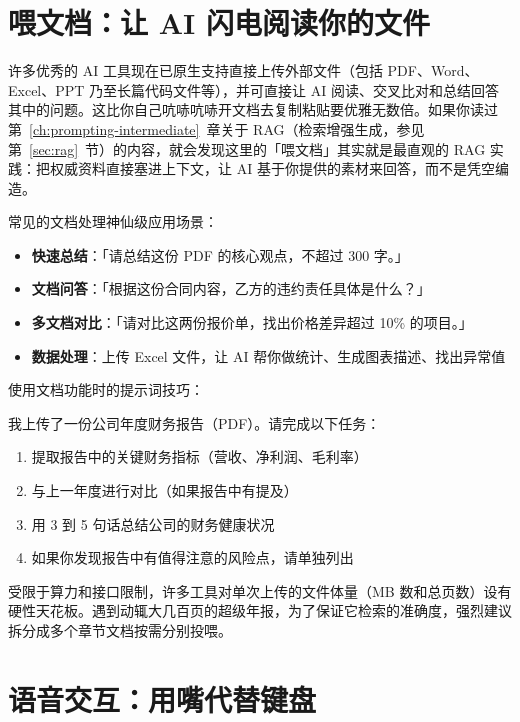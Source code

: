 \section{喂文档：让 AI 闪电阅读你的文件}

许多优秀的 AI 工具现在已原生支持直接上传外部文件（包括 PDF、Word、Excel、PPT 乃至长篇代码文件等），并可直接让 AI 阅读、交叉比对和总结回答其中的问题。这比你自己吭哧吭哧开文档去复制粘贴要优雅无数倍。如果你读过第~\ref{ch:prompting-intermediate}~章关于 RAG（检索增强生成，参见第~\ref{sec:rag}~节）的内容，就会发现这里的「喂文档」其实就是最直观的 RAG 实践：把权威资料直接塞进上下文，让 AI 基于你提供的素材来回答，而不是凭空编造。

常见的文档处理神仙级应用场景：

\begin{itemize}
  \item \textbf{快速总结}：「请总结这份 PDF 的核心观点，不超过 300 字。」
  \item \textbf{文档问答}：「根据这份合同内容，乙方的违约责任具体是什么？」
  \item \textbf{多文档对比}：「请对比这两份报价单，找出价格差异超过 10\% 的项目。」
  \item \textbf{数据处理}：上传 Excel 文件，让 AI 帮你做统计、生成图表描述、找出异常值
\end{itemize}

使用文档功能时的提示词技巧：

\begin{promptbox}
我上传了一份公司年度财务报告（PDF）。请完成以下任务：
\begin{enumerate}
  \item 提取报告中的关键财务指标（营收、净利润、毛利率）
  \item 与上一年度进行对比（如果报告中有提及）
  \item 用 3 到 5 句话总结公司的财务健康状况
  \item 如果你发现报告中有值得注意的风险点，请单独列出
\end{enumerate}
\end{promptbox}

\begin{tipbox}
受限于算力和接口限制，许多工具对单次上传的文件体量（MB 数和总页数）设有硬性天花板。遇到动辄大几百页的超级年报，为了保证它检索的准确度，强烈建议拆分成多个章节文档按需分别投喂。
\end{tipbox}

\section{语音交互：用嘴代替键盘}

